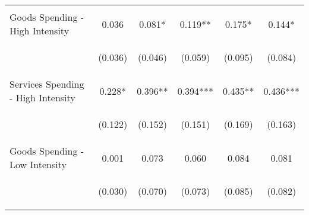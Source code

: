 \begin{tabular}{lccccc}
    \vspace{-2pt} & \vspace{-2pt} & \vspace{-2pt} & \vspace{-2pt} & \vspace{-2pt} \\ \hline
    \vspace{-1.5pt} & \vspace{-1.5pt} & \vspace{-1.5pt} & \vspace{-1.5pt} & \vspace{-1.5pt} \\
    Goods Spending - High Intensity & 0.036 & 0.081* & 0.119** & 0.175* & 0.144* \\
    & \begin{footnotesize}(0.036)\end{footnotesize} & \begin{footnotesize}(0.046)\end{footnotesize} & \begin{footnotesize}(0.059)\end{footnotesize} & \begin{footnotesize}(0.095)\end{footnotesize} & \begin{footnotesize}(0.084)\end{footnotesize} \\
    Services Spending - High Intensity & 0.228* & 0.396** & 0.394*** & 0.435** & 0.436*** \\
    & \begin{footnotesize}(0.122)\end{footnotesize} & \begin{footnotesize}(0.152)\end{footnotesize} & \begin{footnotesize}(0.151)\end{footnotesize} & \begin{footnotesize}(0.169)\end{footnotesize} & \begin{footnotesize}(0.163)\end{footnotesize} \\
    Goods Spending - Low Intensity & 0.001 & 0.073 & 0.060 & 0.084 & 0.081 \\
    & \begin{footnotesize}(0.030)\end{footnotesize} & \begin{footnotesize}(0.070)\end{footnotesize} & \begin{footnotesize}(0.073)\end{footnotesize} & \begin{footnotesize}(0.085)\end{footnotesize} & \begin{footnotesize}(0.082)\end{footnotesize} \\

\end{tabular}
